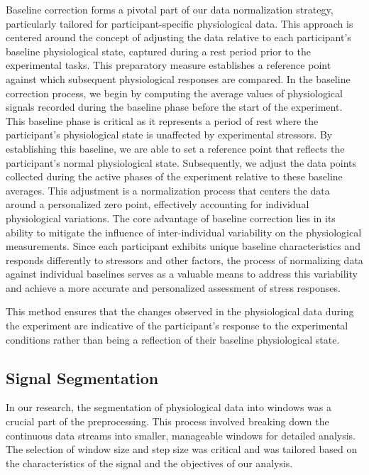 Baseline correction forms a pivotal part of our data normalization strategy, particularly tailored for participant-specific physiological data. This approach is centered around the concept of adjusting the data relative to each participant's baseline physiological state, captured during a rest period prior to the experimental tasks. This preparatory measure establishes a reference point against which subsequent physiological responses are compared.
In the baseline correction process, we begin by computing the average values of physiological signals recorded during the baseline phase before the start of the experiment. This baseline phase is critical as it represents a period of rest where the participant's physiological state is unaffected by experimental stressors. By establishing this baseline, we are able to set a reference point that reflects the participant's normal physiological state. Subsequently, we adjust the data points collected during the active phases of the experiment relative to these baseline averages. This adjustment is a normalization process that centers the data around a personalized zero point, effectively accounting for individual physiological variations. The core advantage of baseline correction lies in its ability to mitigate the influence of inter-individual variability on the physiological measurements. Since each participant exhibits unique baseline characteristics and responds differently to stressors and other factors, the process of normalizing data against individual baselines serves as a valuable means to address this variability and achieve a more accurate and personalized assessment of stress responses.

This method ensures that the changes observed in the physiological data during the experiment are indicative of the participant's response to the experimental conditions rather than being a reflection of their baseline physiological state.

\subsection*{Signal Segmentation}
\label{sec:signal_segmentation}
In our research, the segmentation of physiological data into windows was a crucial part of the preprocessing. This process involved breaking down the continuous data streams into smaller, manageable windows for detailed analysis. The selection of window size and step size was critical and was tailored based on the characteristics of the signal and the objectives of our analysis.

